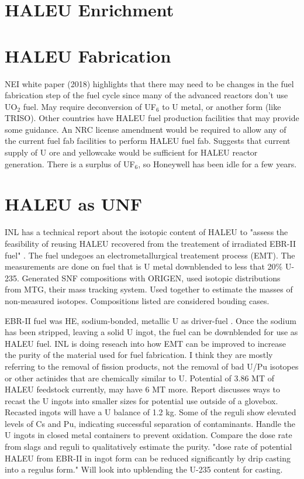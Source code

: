 \documentclass{article}
\begin{document}
\section{HALEU Enrichment}

\section{HALEU Fabrication}
NEI white paper (2018) highlights that there may need to be changes 
in the fuel fabrication step of the fuel cycle since many of the 
advanced reactors don't use UO$_2$ fuel. May require deconversion 
of UF$_6$ to U metal, or another form (like TRISO). Other countries 
have HALEU fuel production facilities that may provide some guidance. 
An NRC license amendment would be required to allow any of the 
current fuel fab facilities to perform HALEU fuel fab. Suggests 
that current supply of U ore and yellowcake would be sufficient for 
HALEU reactor generation. There is a surplus of UF$_6$, so Honeywell 
has been idle for a few years. 

\section{HALEU as UNF}
INL has a technical report about the isotopic content of HALEU to 
"assess the feasibility of reusing HALEU recovered from the treatement 
of irradiated EBR-II fuel" \cite{vaden_isotopic_2018}. The fuel undegoes 
an electrometallurgical treatement process (EMT). The measurements
are done on fuel that is U metal downblended to less that 20\% U-235.
Generated SNF compositions with ORIGEN, used isotopic distributions from 
MTG, their mass tracking system. Used together to estimate the masses of 
non-measured isotopes. Compositions listed are considered bouding cases. 

EBR-II fuel was HE, sodium-bonded, metallic U as driver-fuel 
\cite{patterson_haleu_2019}. Once the sodium has been stripped, leaving 
a solid U ingot, the fuel can be downblended for use as HALEU fuel.
INL is doing reseach into how EMT can be improved to increase the purity 
of the material used for fuel fabrication. I think they are mostly 
referring to the removal of fission products, not the removal of bad 
U/Pu isotopes or other actinides that are chemically similar to U. 
Potential of 3.86 MT of HALEU feedstock currently, may have 6 MT more. 
Report discusses ways to recast the U ingots into smaller sizes for 
potential use outside of a glovebox. Recasted ingots will have a U 
balance of 1.2 kg. Some of the reguli show elevated levels of Cs and 
Pu, indicating successful separation of contaminants. Handle the U 
ingots in closed metal containers to prevent oxidation. Compare the dose 
rate from slags and reguli to qualitatively estimate the purity.
"dose rate of potential HALEU from EBR-II in ingot form can be reduced 
significantly by drip casting into a regulus form." Will look into 
upblending the U-235 content for casting. 
\end{document}
